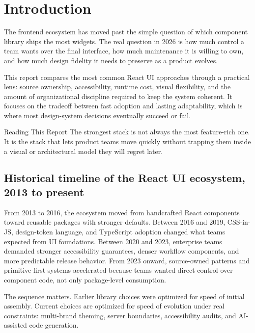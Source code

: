 \documentclass[11pt,twoside,a4paper]{article}
\begin{document}
\vspace*{2.5cm}
\tableofcontents
\clearpage

\setcounter{page}{1}

\section{Introduction}
The frontend ecosystem has moved past the simple question of which component library ships the most widgets. The real question in 2026 is how much control a team wants over the final interface, how much maintenance it is willing to own, and how much design fidelity it needs to preserve as a product evolves.

This report compares the most common React UI approaches through a practical lens: source ownership, accessibility, runtime cost, visual flexibility, and the amount of organizational discipline required to keep the system coherent. It focuses on the tradeoff between fast adoption and lasting adaptability, which is where most design-system decisions eventually succeed or fail.

\begin{highlightbox}{Reading This Report}
The strongest stack is not always the most feature-rich one. It is the stack that lets product teams move quickly without trapping them inside a visual or architectural model they will regret later.
\end{highlightbox}

\subsection{Historical timeline of the React UI ecosystem, 2013 to present}
From 2013 to 2016, the ecosystem moved from handcrafted React components toward reusable packages with stronger defaults. Between 2016 and 2019, CSS-in-JS, design-token language, and TypeScript adoption changed what teams expected from UI foundations. Between 2020 and 2023, enterprise teams demanded stronger accessibility guarantees, denser workflow components, and more predictable release behavior. From 2023 onward, source-owned patterns and primitive-first systems accelerated because teams wanted direct control over component code, not only package-level consumption.

The sequence matters. Earlier library choices were optimized for speed of initial assembly. Current choices are optimized for speed of evolution under real constraints: multi-brand theming, server boundaries, accessibility audits, and AI-assisted code generation.
\end{document}
